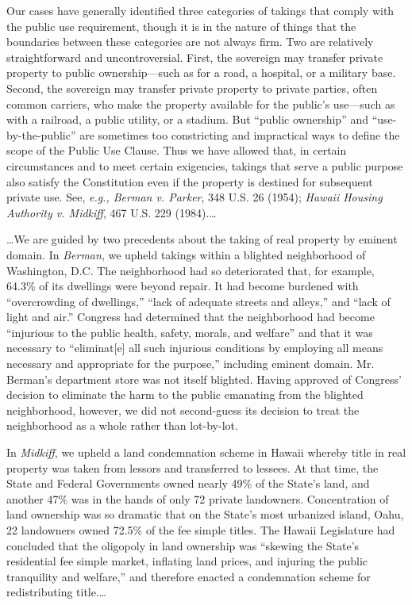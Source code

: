 Our cases have generally identified three categories of takings that comply with
the public use requirement, though it is in the nature of things that the
boundaries between these categories are not always firm. Two are relatively
straightforward and uncontroversial. First, the sovereign may transfer private
property to public ownership---such as for a road, a hospital, or a military
base. Second, the sovereign may transfer private property to private parties,
often common carriers, who make the property available for the public's
use---such as with a railroad, a public utility, or a stadium. But ``public
ownership'' and ``use-by-the-public'' are sometimes too constricting and
impractical ways to define the scope of the Public Use Clause. Thus we have
allowed that, in certain circumstances and to meet certain exigencies, takings
that serve a public purpose also satisfy the Constitution even if the property
is destined for subsequent private use. See, \textit{e.g., Berman v. Parker},
348 U.S. 26 (1954); \textit{Hawaii Housing Authority v. Midkiff}, 467 U.S. 229
(1984).\ldots

\ldots We are guided by two precedents about the taking of real property by
eminent domain. In \textit{Berman}, we upheld takings within a blighted
neighborhood of Washington, D.C. The neighborhood had so deteriorated that, for
example, 64.3\% of its dwellings were beyond repair. It had become burdened with
``overcrowding of dwellings,'' ``lack of adequate streets and alleys,'' and
``lack of light and air.'' Congress had determined that the neighborhood had
become ``injurious to the public health, safety, morals, and welfare'' and that
it was necessary to ``eliminat[e] all such injurious conditions by employing all
means necessary and appropriate for the purpose,'' including eminent domain. Mr.
Berman's department store was not itself blighted. Having approved of Congress'
decision to eliminate the harm to the public emanating from the blighted
neighborhood, however, we did not second-guess its decision to treat the
neighborhood as a whole rather than lot-by-lot. 

In \textit{Midkiff}, we upheld a land condemnation scheme in Hawaii whereby
title in real property was taken from lessors and transferred to lessees. At
that time, the State and Federal Governments owned nearly 49\% of the State's
land, and another 47\% was in the hands of only 72 private landowners.
Concentration of land ownership was so dramatic that on the State's most
urbanized island, Oahu, 22 landowners owned 72.5\% of the fee simple titles. The
Hawaii Legislature had concluded that the oligopoly in land ownership was
``skewing the State's residential fee simple market, inflating land prices, and
injuring the public tranquility and welfare,'' and therefore enacted a
condemnation scheme for redistributing title.\ldots

